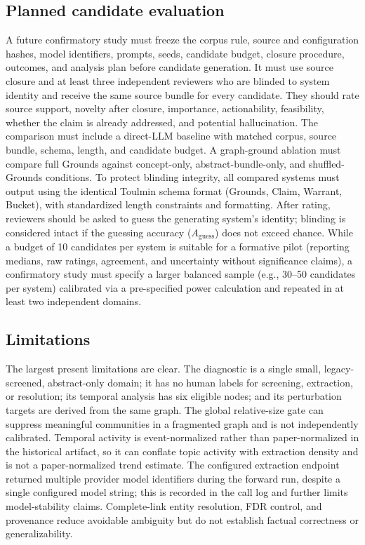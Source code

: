 \documentclass[runningheads]{llncs}
\begin{document}
\subsection{Planned candidate evaluation}
A future confirmatory study must freeze the corpus rule, source and configuration hashes, model identifiers, prompts, seeds, candidate budget, closure procedure, outcomes, and analysis plan before candidate generation. It must use source closure and at least three independent reviewers who are blinded to system identity and receive the same source bundle for every candidate. They should rate source support, novelty after closure, importance, actionability, feasibility, whether the claim is already addressed, and potential hallucination. The comparison must include a direct-LLM baseline with matched corpus, source bundle, schema, length, and candidate budget. A graph-ground ablation must compare full Grounds against concept-only, abstract-bundle-only, and shuffled-Grounds conditions. To protect blinding integrity, all compared systems must output using the identical Toulmin schema format (Grounds, Claim, Warrant, Bucket), with standardized length constraints and formatting. After rating, reviewers should be asked to guess the generating system's identity; blinding is considered intact if the guessing accuracy ($A_{\mathrm{guess}}$) does not exceed chance. While a budget of 10 candidates per system is suitable for a formative pilot (reporting medians, raw ratings, agreement, and uncertainty without significance claims), a confirmatory study must specify a larger balanced sample (e.g., 30--50 candidates per system) calibrated via a pre-specified power calculation and repeated in at least two independent domains.

\subsection{Limitations}
The largest present limitations are clear. The diagnostic is a single small, legacy-screened, abstract-only domain; it has no human labels for screening, extraction, or resolution; its temporal analysis has six eligible nodes; and its perturbation targets are derived from the same graph. The global relative-size gate can suppress meaningful communities in a fragmented graph and is not independently calibrated. Temporal activity is event-normalized rather than paper-normalized in the historical artifact, so it can conflate topic activity with extraction density and is not a paper-normalized trend estimate. The configured extraction endpoint returned multiple provider model identifiers during the forward run, despite a single configured model string; this is recorded in the call log and further limits model-stability claims. Complete-link entity resolution, FDR control, and provenance reduce avoidable ambiguity but do not establish factual correctness or generalizability.
\end{document}
